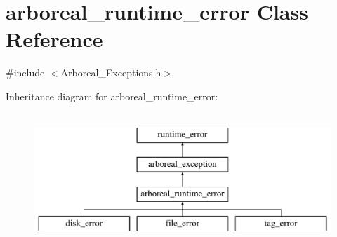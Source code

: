 \hypertarget{classarboreal__runtime__error}{}\section{arboreal\+\_\+runtime\+\_\+error Class Reference}
\label{classarboreal__runtime__error}


{\ttfamily \#include $<$Arboreal\+\_\+\+Exceptions.\+h$>$}

Inheritance diagram for arboreal\+\_\+runtime\+\_\+error\+:\begin{figure}[H]
\begin{center}
\leavevmode
\includegraphics[height=5.000000cm]{classarboreal__runtime__error}
\end{center}
\end{figure}
